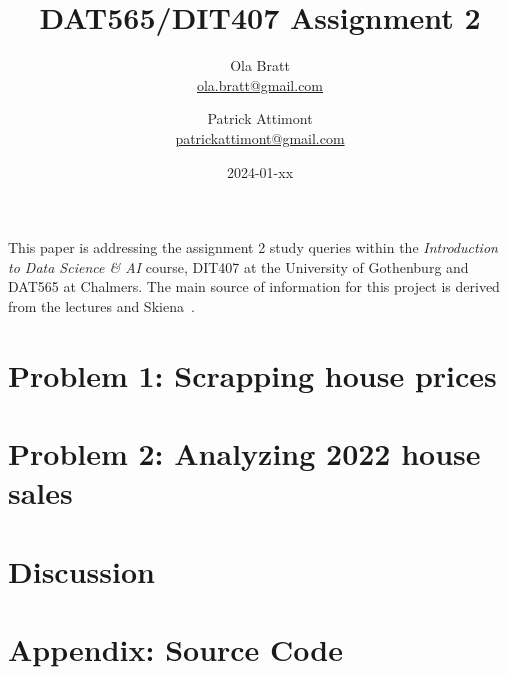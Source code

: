 \documentclass[a4paper]{article}
\begin{document}
\author{Ola Bratt \\
  \href{mailto:ola.bratt@gmail.com}{ola.bratt@gmail.com}
  \and
  Patrick Attimont \\
  \href{patrickattimont@gmail.com}{patrickattimont@gmail.com}
}

\title{DAT565/DIT407 Assignment 2}
\date{2024-01-xx}

\maketitle

This paper is addressing the assignment 2 study queries within the \emph{Introduction to Data Science \& AI} course, DIT407 at 
the University of Gothenburg and DAT565 at Chalmers. The main source of information for this project
is derived from the lectures and Skiena~\cite{Skiena:2024}. 
\section*{Problem 1: Scrapping house prices}

\section*{Problem 2: Analyzing 2022 house sales}

\section*{Discussion}

\newpage


\printbibliography

\section*{Appendix: Source Code}



%
\end{document}
